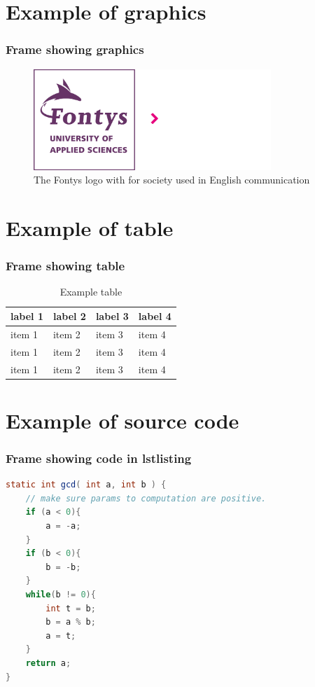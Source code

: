 \documentclass[aspectratio=169]{beamer}
\begin{document}
\section{Example of graphics}
\begin{frame}
    \frametitle{Frame showing graphics}
    
    \begin{figure}
        \centering
        \includegraphics[width=0.8\textwidth]{logo_purple_society_en.png}
        \caption{The Fontys logo with for society used in English communication}
        \label{fig:logo}
    \end{figure}

\end{frame}

\section{Example of table}
\begin{frame}
    \frametitle{Frame showing table}

    \begin{table}
        \begin{tabularx}{\textwidth}{ |X|X|X|X| }
            \hline
            label 1 & label 2 & label 3 & label 4 \\
            \hline 
            item 1  & item 2  & item 3  & item 4  \\
            \hline 
            item 1  & item 2  & item 3  & item 4  \\
            \hline 
            item 1  & item 2  & item 3  & item 4  \\
            \hline
          \end{tabularx}
          \caption{Example table}
    \end{table}

\end{frame}

\section{Example of source code}
\begin{frame}[containsverbatim]
    \frametitle{Frame showing code in lstlisting}

\begin{lstlisting}[language=Java]
static int gcd( int a, int b ) {
    // make sure params to computation are positive.
    if (a < 0){
        a = -a;
    }
    if (b < 0){
        b = -b;
    }
    while(b != 0){
        int t = b;
        b = a % b;
        a = t;
    }
    return a;
}
\end{lstlisting}

\end{frame}
\end{document}
